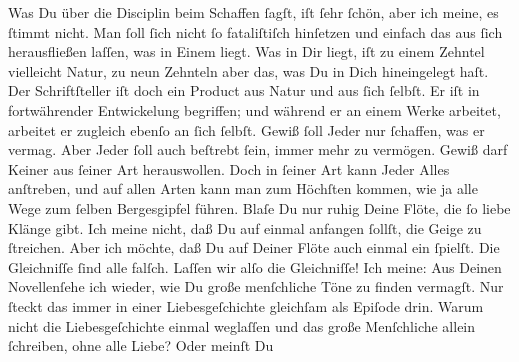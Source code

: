 \pstart
           Was Du über die Disciplin beim Schaffen{ }ſagſt, iſt{ }ſehr{ }ſchön, aber ich meine, es{ }ſtimmt nicht. Man{ }ſoll{ }ſich nicht{ }ſo fataliſtiſch hinſetzen\strikeout{,} und einfach das aus{ }ſich herausfließen laſſen, was in Einem liegt. Was in
               Dir liegt, iſt zu einem Zehntel vielleicht Natur, zu  neun Zehnteln aber das, was Du in Dich hineingelegt haſt. Der
               Schriftſteller iſt doch ein Product aus Natur und aus{ }ſich{ }ſelbſt. Er iſt in
               fortwährender Entwickelung begriffen; und {\pb}während
               er an einem Werke arbeitet, \strikeout{\textcolor{gray}{×}{ }\textcolor{gray}{arb}} arbeitet er zugleich ebenſo an{ }ſich{ }ſelbſt. Gewiß{ }ſoll Jeder nur{ }ſchaffen, was
               er vermag. Aber Jeder{ }ſoll auch beſtrebt{ }ſein, 
               immer mehr zu vermögen. Gewiß darf Keiner aus{ }ſeiner Art herauswollen. Doch in{ }ſeiner
               Art kann Jeder Alles anſtreben, und auf allen Arten kann man zum Höchſten kommen, wie
                   ja alle Wege zum{ }ſelben Bergesgipfel führen.
               Blaſe Du nur ruhig Deine Flöte, die{ }ſo liebe Klänge gibt. Ich meine  nicht, daß Du auf einmal anfangen{ }ſollſt, die
               Geige zu{ }ſtreichen. Aber ich möchte, daß Du auf Deiner Flöte auch  einmal ein \label{K_L02861-2v}\label{K_L02861-2}{ }ſpielſt. Die Gleichniſſe{ }ſind alle falſch. Laſſen wir alſo die Gleichniſſe!
               Ich meine: Aus Deinen Novellenſehe ich wieder,  wie Du große menſchliche Töne zu finden vermagſt. Nur{ }ſteckt das immer in
               einer Liebesgeſchichte gleichſam als Epiſode drin. Warum nicht die Liebesgeſchichte
               einmal weglaſſen und das große Menſchliche \strikeout{\textcolor{gray}{al}}{ } allein{ }ſchreiben, ohne alle Liebe? Oder meinſt Du
